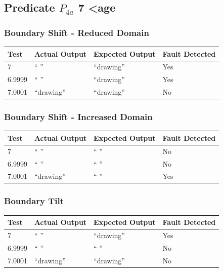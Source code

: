 \documentclass[11pt, oneside]{article}   	%
\begin{document}
\subsection{Predicate $P_{4a}$ 7 \textless age}
\subsubsection{Boundary Shift - Reduced Domain}
\begin{table}[!htb]
\centering
\begin{tabular}{|l|l|l|l|}
\hline
Test   & Actual Output & Expected Output & Fault Detected \\ \hline
7      & “ ”           & “drawing”       & Yes            \\ \hline
6.9999 & “ ”           & “drawing”       & Yes            \\ \hline
7.0001 & “drawing”     & “drawing”       & No             \\ \hline
\end{tabular}
\end{table}

\subsubsection{Boundary Shift - Increased Domain}
\begin{table}[!htb]
\centering
\begin{tabular}{|l|l|l|l|}
\hline
Test   & Actual Output & Expected Output & Fault Detected \\ \hline
7      & “ ”           & “ ”             & No             \\ \hline
6.9999 & “ ”           & “ ”             & No             \\ \hline
7.0001 & “drawing”     & “ ”             & Yes            \\ \hline
\end{tabular}
\end{table}

\subsubsection{Boundary Tilt}
\begin{table}[!htb]
\centering
\begin{tabular}{|l|l|l|l|}
\hline
Test   & Actual Output & Expected Output & Fault Detected \\ \hline
7      & “ ”           & “drawing”       & Yes            \\ \hline
6.9999 & “ ”           & “ ”             & No             \\ \hline
7.0001 & “drawing”     & “drawing”       & No             \\ \hline
\end{tabular}
\end{table}
\end{document}

